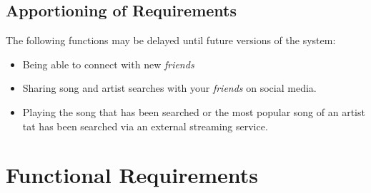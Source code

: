 \documentclass[]{article}
\begin{document}
\subsection{Apportioning of Requirements}
\label{sub:apportioning_of_requirements}
The following functions may be delayed until future versions of the system:
\begin{itemize}
	\item Being able to connect with new \textit{friends}
	\item Sharing song and artist searches with your \textit{friends} on social media.
	\item Playing the song that has been searched or the most popular song of an artist tat has been searched via an external streaming service.
\end{itemize}


\section{Functional Requirements}
\label{sec:functional_requirements}
\end{document}
